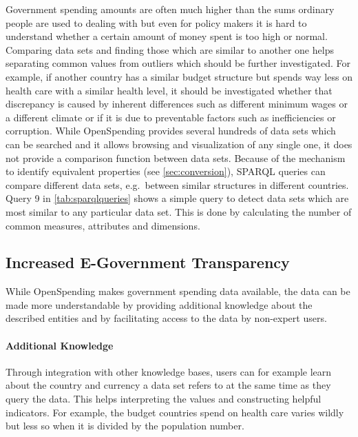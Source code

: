 \documentclass[sw]{iosart2x}
\begin{document}
Government spending amounts are often much higher than the sums ordinary people are used to dealing with but even for policy makers it is hard to understand whether a certain amount of money spent is too high or normal.
Comparing data sets and finding those which are similar to another one helps separating common values from outliers which should be further investigated.
For example, if another country has a similar budget structure but spends way less on health care with a similar health level,
it should be investigated whether that discrepancy is caused by inherent differences such as different minimum wages or a different climate or if it is due to preventable factors such as inefficiencies or corruption.
While OpenSpending provides several hundreds of data sets which can be searched and it allows browsing and visualization of any single one, it does not provide a comparison function between data sets.
Because of the mechanism to identify equivalent properties (see \autoref{sec:conversion}), SPARQL queries can compare different data sets, e.g.~between similar structures in different countries.
Query 9 in \autoref{tab:sparqlqueries} shows a simple query to detect data sets which are most similar to any particular data set.
This is done by calculating the number of common measures, attributes and dimensions.
\iffalse
\subsection{Increased E-Government Transparency}
While OpenSpending makes government spending data available, the data can be made more understandable by providing additional knowledge about the described entities and by facilitating access to the data by non-expert users.
\paragraph{Additional Knowledge}
Through integration with other knowledge bases, users can for example learn about the country and currency a data set refers to at the same time as they query the data. 
This helps interpreting the values and constructing helpful indicators. For example, the budget countries spend on health care varies wildly but less so when it is divided by the population number.
\end{document}
